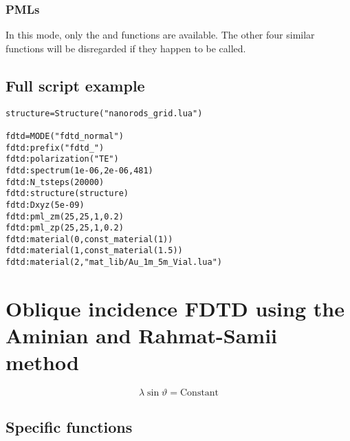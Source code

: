 \subsubsection{PMLs}

In this mode, only the  and  functions are available. The other four similar functions will be disregarded if they happen to be called.

\subsection{Full script example}

\begin{lstlisting}
structure=Structure("nanorods_grid.lua")

fdtd=MODE("fdtd_normal")
fdtd:prefix("fdtd_")
fdtd:polarization("TE")
fdtd:spectrum(1e-06,2e-06,481)
fdtd:N_tsteps(20000)
fdtd:structure(structure)
fdtd:Dxyz(5e-09)
fdtd:pml_zm(25,25,1,0.2)
fdtd:pml_zp(25,25,1,0.2)
fdtd:material(0,const_material(1))
fdtd:material(1,const_material(1.5))
fdtd:material(2,"mat_lib/Au_1m_5m_Vial.lua")
\end{lstlisting}

\section{Oblique incidence FDTD using the Aminian and Rahmat-Samii method} 


	\fwarn
	\cite{Aminian:06}
	\begin{equation}
		\lambda\sin\vartheta=\textrm{Constant}
	\end{equation}

\subsection{Specific functions}

